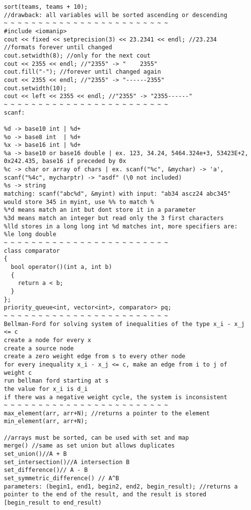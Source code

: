 \documentclass[11pt, oneside]{article}
\begin{document}
\begin{lstlisting}
sort(teams, teams + 10);
//drawback: all variables will be sorted ascending or descending
~ ~ ~ ~ ~ ~ ~ ~ ~ ~ ~ ~ ~ ~ ~ ~ ~ ~ ~ ~ ~ ~ ~ ~
#include <iomanip>
cout << fixed << setprecision(3) << 23.2341 << endl; //23.234 //formats forever until changed
cout.setwidth(8); //only for the next cout
cout << 2355 << endl; //"2355" -> "    2355"
cout.fill("-"); //forever until changed again
cout << 2355 << endl; //"2355" -> "------2355"
cout.setwidth(10);
cout << left << 2355 << endl; //"2355" -> "2355------"
~ ~ ~ ~ ~ ~ ~ ~ ~ ~ ~ ~ ~ ~ ~ ~ ~ ~ ~ ~ ~ ~ ~ ~
scanf:

%d -> base10 int | %d+
%o -> base8 int  | %d+
%x -> base16 int | %d+
%a -> base10 or base16 double | ex. 123, 34.24, 5464.324e+3, 53423E+2, 0x242.435, base16 if preceded by 0x
%c -> char or array of chars | ex. scanf("%c", &mychar) -> 'a', scanf("%4c", mycharptr) -> "asdf" (\0 not included)
%s -> string
matching: scanf("abc%d", &myint) with input: "ab34 ascz24 abc345" would store 345 in myint, use %% to match %
%*d means match an int but dont store it in a parameter
%3d means match an integer but read only the 3 first characters
%lld stores in a long long int %d matches int, more specifiers are:
%le long double
~ ~ ~ ~ ~ ~ ~ ~ ~ ~ ~ ~ ~ ~ ~ ~ ~ ~ ~ ~ ~ ~ ~ ~
class comparator
{
  bool operator()(int a, int b)
  {
    return a < b;
  }
};
priority_queue<int, vector<int>, comparator> pq;
~ ~ ~ ~ ~ ~ ~ ~ ~ ~ ~ ~ ~ ~ ~ ~ ~ ~ ~ ~ ~ ~ ~ ~
Bellman-Ford for solving system of inequalities of the type x_i - x_j <= c
create a node for every x
create a source node
create a zero weight edge from s to every other node
for every inequality x_i - x_j <= c, make an edge from i to j of weight c
run bellman ford starting at s
the value for x_i is d_i
if there was a negative weight cycle, the system is inconsistent
~ ~ ~ ~ ~ ~ ~ ~ ~ ~ ~ ~ ~ ~ ~ ~ ~ ~ ~ ~ ~ ~ ~ ~
max_element(arr, arr+N); //returns a pointer to the element
min_element(arr, arr+N);

//arrays must be sorted, can be used with set and map
merge() //same as set union but allows duplicates
set_union()//A + B
set_intersection()//A intersection B
set_difference()// A - B
set_symmetric_difference() // A^B
parameters: (begin1, end1, begin2, end2, begin_result); //returns a pointer to the end of the result, and the result is stored [begin_result to end_result)


\end{lstlisting}
\end{document}
